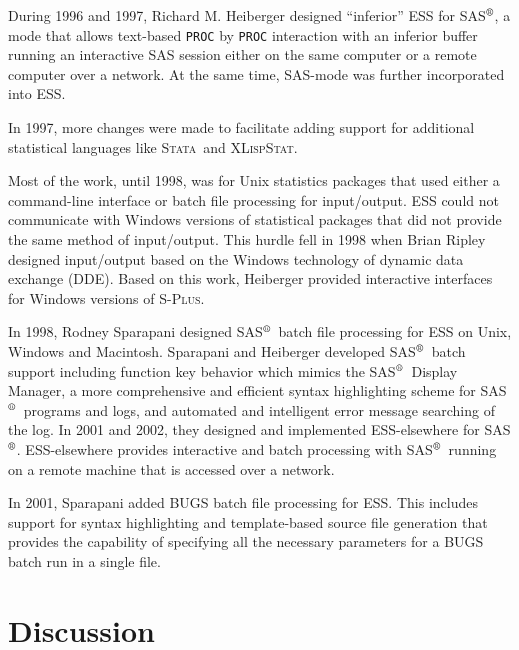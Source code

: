 \documentclass{article}
\newcommand*{\SAS}{\textsc{SAS}$^{\mbox{\scriptsize\textregistered}}$}
\newcommand*{\Splus}{\textsc{S-Plus}}
\newcommand*{\XLispStat}{\textsc{XLispStat}}
\newcommand*{\Stata}{\textsc{Stata}}
\newcommand{\stexttt}[1]{{\small\texttt{#1}}}
\begin{document}
During 1996 and 1997, Richard M. Heiberger designed ``inferior'' ESS
for \SAS, a mode that allows text-based \stexttt{PROC} by
\stexttt{PROC} interaction with an inferior buffer running an interactive SAS
session either on the same computer or a remote computer over a network.
At the same time, SAS-mode was further incorporated into ESS.

In 1997, more changes were made to facilitate
adding support for additional statistical languages like \Stata\ and
\XLispStat.

Most of the work, until 1998, was for Unix statistics
packages that used either a command-line interface or batch file
processing for input/output.  ESS could not communicate
with Windows versions of statistical packages that did not provide
the same method of input/output.  This hurdle
fell in 1998 when Brian Ripley designed input/output based on
the Windows technology of dynamic data exchange (DDE).
Based on this work, Heiberger provided interactive interfaces
for Windows versions of \Splus.

In 1998, Rodney Sparapani designed \SAS\ batch file processing for ESS
on Unix, Windows and Macintosh.
Sparapani and Heiberger developed \SAS\ batch support including function
key behavior which mimics the \SAS\ Display Manager,
a more comprehensive and efficient syntax highlighting scheme for \SAS\
programs and logs, and automated and intelligent error message searching
of the log.  In 2001 and 2002, they designed and implemented ESS-elsewhere
for \SAS.  ESS-elsewhere provides interactive and batch processing
with \SAS\ running on a remote machine that is accessed over a
network.

In 2001, Sparapani added BUGS batch file processing for ESS.  This
includes support for syntax highlighting and template-based source file
generation that provides the capability of specifying all the necessary
parameters for a BUGS batch run in a single file.

\section{Discussion}
\label{sec:discussion}
\end{document}
